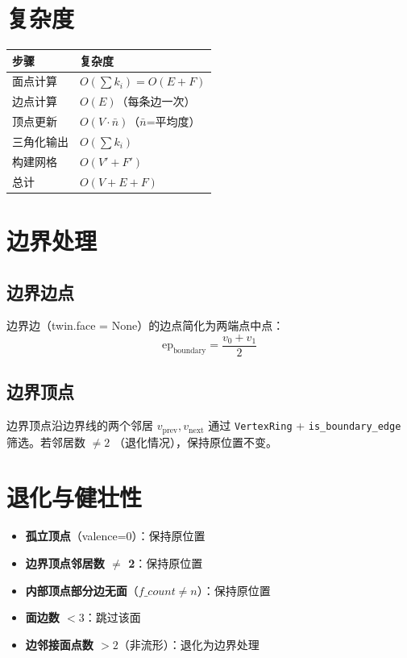 \documentclass[11pt,a4paper]{article}
\begin{document}
\section{复杂度}

\begin{center}
\begin{tabular}{@{}ll@{}}
  \toprule
  \textbf{步骤} & \textbf{复杂度} \\
  \midrule
  面点计算 & $O(\sum k_i) = O(E + F)$ \\
  边点计算 & $O(E)$（每条边一次） \\
  顶点更新 & $O(V \cdot \bar{n})$（$\bar{n}$=平均度） \\
  三角化输出 & $O(\sum k_i)$ \\
  构建网格 & $O(V' + F')$ \\
  \midrule
  总计 & $O(V + E + F)$ \\
  \bottomrule
\end{tabular}
\end{center}

\section{边界处理}

\subsection{边界边点}

边界边（twin.face = None）的边点简化为两端点中点：
\[
  \text{ep}_{\text{boundary}} = \frac{v_0 + v_1}{2}
\]

\subsection{边界顶点}

边界顶点沿边界线的两个邻居 $v_{\text{prev}}, v_{\text{next}}$ 通过
\texttt{VertexRing} + \texttt{is\_boundary\_edge} 筛选。若邻居数 $\neq 2$
（退化情况），保持原位置不变。

\section{退化与健壮性}

\begin{itemize}
  \item \textbf{孤立顶点}（valence=0）：保持原位置
  \item \textbf{边界顶点邻居数 $\neq$ 2}：保持原位置
  \item \textbf{内部顶点部分边无面}（$f\_count \neq n$）：保持原位置
  \item \textbf{面边数 $< 3$}：跳过该面
  \item \textbf{边邻接面点数 $> 2$}（非流形）：退化为边界处理
\end{itemize}
\end{document}
